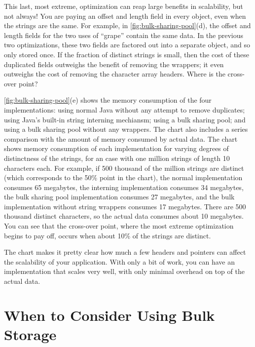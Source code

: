 This last, most extreme, optimization can reap large benefits in scalability,
but not always! You are paying an offset and length field in every object, even
when the strings are the same. For example, in
\autoref{fig:bulk-sharing-pool}(d), the offset and length fields for the two
uses of ``grape'' contain the same data. In the previous two optimizations,
these two fields are factored out into a separate  object, and so
only stored once. If the fraction of distinct strings
is small, then the cost of these duplicated fields outweighs the benefit of
removing the wrappers; it even outweighs the cost of removing the character
array headers. Where is the cross-over point?

\autoref{fig:bulk-sharing-pool}(e) shows the memory consumption of the four
implementations: using normal Java  without any attempt to remove
duplicates; using Java's built-in string interning mechiansm; using a bulk
sharing pool; and using a bulk sharing pool without any  wrappers.
The chart also includes a series comparison with the amount of memory consumed by
actual data.  The chart shows memory consumption of each implementation for
varying degrees of distinctness of the strings, for an case with one million
strings of length 10 characters each.
For example, if 500 thousand of the million strings are distinct (which
corresponds to the 50\% point in the chart), the normal implementation consumes
65 megabytes, the interning implementation consumes 34 megabytes, the bulk
sharing pool implementation consumes 27 megabytes, and the bulk implementation
without string wrappers consumes 17 megabytes. There are 500 thousand
distinct characters, so the actual data consumes about 10 megabytes. You can see
that the cross-over point, where the most extreme optimization begins to pay
off, occurs when about 10\% of the strings are distinct.

The chart makes it pretty clear how much a few headers and pointers can affect
the scalability of your application. With only a bit of work, you can have an
implementation that scales very well, with only minimal overhead on top of the
actual data.





\section{When to Consider Using Bulk Storage}
\label{sec:when-bulk-storage-is-applicable}


